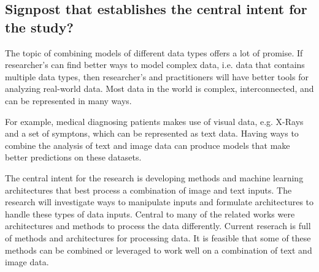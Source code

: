 \subsection{Signpost that establishes the central intent for the study?}



The topic of combining models of different data types offers a lot of promise.  If researcher's can find better ways to model complex data, i.e. data that contains multiple data types, then researcher's and practitioners will have better tools for analyzing real-world data.  Most data in the world is complex, interconnected, and can be represented in many ways.

For example, medical diagnosing patients makes use of visual data, e.g. X-Rays and a set of symptons, which can be represented as text data.  Having ways to combine the analysis of text and image data can produce models that make better predictions on these datasets. %

The central intent for the research is developing methods and machine learning architectures that best process a combination of image and text inputs. The research will investigate ways to manipulate inputs and formulate architectures to handle these types of data inputs.  Central to many of the related works were architectures and methods to process the data differently.  Current reserach is full of methods and architectures for processing data. It is feasible that some of these methods can be combined or leveraged to work well on a combination of text and image data.


